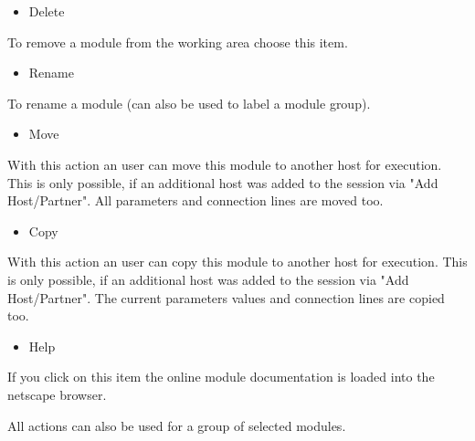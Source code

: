 \begin{itemize}
\item Delete
\end{itemize}

To remove a module from the working area choose this item.

\begin{itemize}
\item Rename
\end{itemize}

To rename a module (can also be used to label a module group).

\begin{itemize}
\item Move 
\end{itemize}

With this action an user can move this module to another host for execution. This is only 
possible, if an additional host was added to the session via "Add Host/Partner". All 
parameters and connection lines are moved too.

\begin{itemize}
\item Copy 
\end{itemize}

With this action an user can copy this module to another host for execution. This is only 
possible, if an additional host was added to the session via "Add Host/Partner". The 
current parameters values and connection lines are copied too.

\begin{itemize}
\item Help
\end{itemize} 

If you click on this item the online module documentation is loaded into the 
netscape browser. 

All actions can also be used for a group of selected modules.



